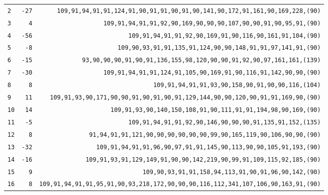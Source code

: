 \begin{table}[!phtb]
\begin{tabular}{@{\hskip 0.31cm}L@{\hskip 0.27cm}r@{\hskip 0.27cm}R@{\hskip 0.34cm}}
		\texttt{2} & \texttt{-27} & \scriptsize\texttt{109,91,94,91,91,124,91,90,91,91,90,91,90,141,90,172,91,161,90,169,228,{\color{gray}(90)}} \\
		\texttt{3} & \texttt{4} & \scriptsize\texttt{109,91,94,91,91,92,90,169,90,90,90,107,90,90,91,90,95,91,{\color{gray}(90)}} \\
		\texttt{4} & \texttt{-56} & \scriptsize\texttt{109,91,94,91,91,92,90,169,91,90,116,90,161,91,104,{\color{gray}(90)}} \\
		\texttt{5} & \texttt{-8} & \footnotesize\texttt{109,90,93,91,91,135,91,124,90,90,148,91,91,97,141,91,{\color{gray}(90)}} \\
		\texttt{6} & \texttt{-15} & \scriptsize\texttt{93,90,90,90,91,90,91,136,155,98,120,90,90,91,92,90,97,161,161,{\color{gray}(139)}} \\
		\texttt{7} & \texttt{-30} & \footnotesize\texttt{109,91,94,91,91,124,91,105,90,169,91,90,116,91,142,90,90,{\color{gray}(90)}} \\
		\texttt{8} & \texttt{8} & \scriptsize\texttt{109,91,94,91,91,93,90,158,90,91,90,90,116,{\color{gray}(104)}} \\
		\texttt{9} & \texttt{11} & \footnotesize\texttt{109,91,93,90,171,90,90,91,90,91,90,91,129,144,90,90,120,90,91,91,169,90,{\color{gray}(90)}} \\
		\texttt{10} & \texttt{14} & \scriptsize\texttt{109,91,93,90,140,150,108,91,90,111,91,91,194,98,90,169,{\color{gray}(90)}} \\
		\texttt{11} & \texttt{-5} & \scriptsize\texttt{109,91,94,91,91,92,90,146,90,90,90,91,135,91,152,{\color{gray}(135)}} \\
		\texttt{12} & \texttt{8} & \scriptsize\texttt{91,94,91,91,121,90,90,90,90,90,90,99,90,165,119,90,106,90,90,{\color{gray}(90)}} \\
		\texttt{13} & \texttt{-32} & \scriptsize\texttt{109,91,94,91,91,96,90,97,91,91,145,90,113,90,90,105,91,193,{\color{gray}(90)}} \\
		\texttt{14} & \texttt{-16} & \scriptsize\texttt{109,91,93,91,129,149,91,90,90,142,219,90,99,91,109,115,92,185,{\color{gray}(90)}} \\
		\texttt{15} & \texttt{9} & \scriptsize\texttt{109,90,93,91,91,158,94,113,91,90,91,96,90,142,{\color{gray}(90)}} \\
		\texttt{16} & \texttt{8} & \scriptsize\texttt{109,91,94,91,91,95,91,90,93,218,172,90,90,90,116,112,341,107,106,90,163,91,{\color{gray}(90)}} \\

\end{tabular}
\end{table}
